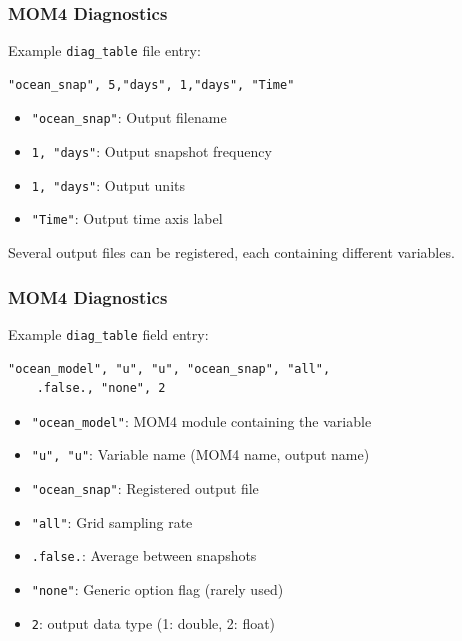 \documentclass[red]{beamer}
\begin{document}
\begin{frame}[fragile]
    \frametitle{MOM4 Diagnostics}
    
    Example \lstinline|diag_table| file entry:
    \begin{lstlisting}
"ocean_snap", 5,"days", 1,"days", "Time"
    \end{lstlisting}
    \begin{itemize}
        \item \lstinline|"ocean_snap"|: Output filename
        \item \lstinline|1, "days"|: Output snapshot frequency
        \item \lstinline|1, "days"|: Output units
        \item \lstinline|"Time"|: Output time axis label
    \end{itemize}
    Several output files can be registered, each containing different
    variables.
\end{frame}

\begin{frame}[fragile]
    \frametitle{MOM4 Diagnostics}
    
    Example \lstinline|diag_table| field entry:
    \begin{lstlisting}
"ocean_model", "u", "u", "ocean_snap", "all",
    .false., "none", 2
    \end{lstlisting}
    \begin{itemize}
        \item \lstinline|"ocean_model"|: MOM4 module containing the variable
        \item \lstinline|"u", "u"|: Variable name (MOM4 name, output name)
        \item \lstinline|"ocean_snap"|: Registered output file
        \item \lstinline|"all"|: Grid sampling rate
        \item \lstinline|.false.|: Average between snapshots
        \item \lstinline|"none"|: Generic option flag (rarely used)
        \item \lstinline|2|: output data type (1: double, 2: float)
    \end{itemize}
\end{frame}

\end{document}
